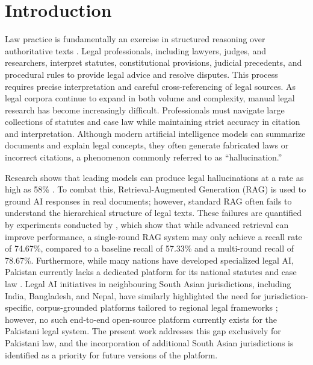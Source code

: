 \section{Introduction}
\label{sec:intro}

Law practice is fundamentally an exercise in structured reasoning over authoritative
texts \cite{r9}. Legal professionals, including lawyers, judges, and researchers, interpret statutes, constitutional provisions, judicial precedents, and
procedural rules to provide legal advice and resolve disputes. This process requires
precise interpretation and careful cross-referencing of legal sources. As legal corpora
continue to expand in both volume and complexity, manual legal research has become
increasingly difficult. Professionals must navigate large collections of statutes and
case law while maintaining strict accuracy in citation and interpretation. Although
modern artificial intelligence models can summarize documents and explain legal concepts,
they often generate fabricated laws or incorrect citations, a phenomenon commonly
referred to as ``hallucination.''

Research shows that leading models can produce legal hallucinations at a rate as high as
58\% \cite{r88}. To combat this, Retrieval-Augmented Generation (RAG) is used to ground
AI responses in real documents; however, standard RAG often fails to understand the
hierarchical structure of legal texts. These failures are quantified by experiments
conducted by \cite{r96}, which show that while advanced retrieval can improve
performance, a single-round RAG system may only achieve a recall rate of 74.67\%,
compared to a baseline recall of 57.33\% and a multi-round recall of 78.67\%.
Furthermore, while many nations have developed specialized legal AI, Pakistan currently
lacks a dedicated platform for its national statutes and case law \cite{r43}. Legal AI
initiatives in neighbouring South Asian jurisdictions, including India, Bangladesh, and Nepal, have similarly highlighted the need for jurisdiction-specific, corpus-grounded
platforms tailored to regional legal frameworks \cite{r58}; however, no such
end-to-end open-source platform currently exists for the Pakistani legal system. The
present work addresses this gap exclusively for Pakistani law, and the incorporation
of additional South Asian jurisdictions is identified as a priority for future versions
of the platform.

